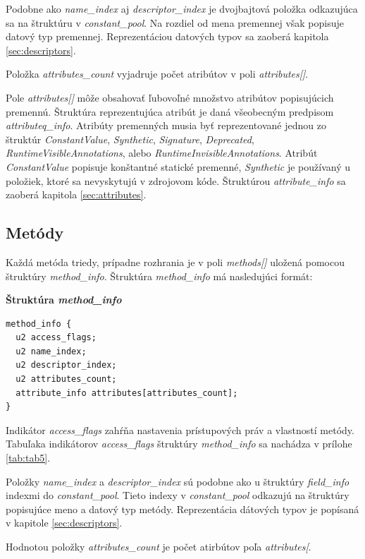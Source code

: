 \documentclass[11pt,final,oneside]{fithesis}
\newenvironment{example}[1]
{
\vspace{5mm}
\noindent\textbf{#1}
\vspace{1mm}
}
{
\vspace{5mm}
}
\begin{document}
Podobne ako \textit{name\_index} aj \textit{descriptor\_index} je dvojbajtová
položka odkazujúca sa na štruktúru v \textit{constant\_pool}. Na rozdiel od
mena premennej však popisuje datový typ premennej. Reprezentáciou datových
typov sa zaoberá kapitola \ref{sec:descriptors}.

Položka \textit{attributes\_count} vyjadruje počet atribútov v poli
\textit{attributes[]}.

Pole \textit{attributes[]} môže obsahovať ľubovoľné množstvo atribútov
popisujúcich premennú. Štruktúra reprezentujúca atribút je daná všeobecným
predpisom \textit{attributeq\_info}. Atribúty premenných musia byť
reprezentované jednou zo štruktúr \textit{ConstantValue}, \textit{Synthetic},
\textit{Signature}, \textit{Deprecated}, \textit{RuntimeVisibleAnnotations},
alebo \textit{RuntimeInvisibleAnnotations}. Atribút \textit{ConstantValue}
popisuje konštantné statické premenné, \textit{Synthetic} je používaný u
položiek, ktoré sa nevyskytujú v zdrojovom kóde. Štruktúrou
\textit{attribute\_info} sa zaoberá kapitola \ref{sec:attributes}.

\subsection{Metódy}
\label{sec:methods}
Každá metóda triedy, prípadne rozhrania je v poli \textit{methods[]} uložená
pomocou štruktúry \textit{method\_info}. Štruktúra \textit{method\_info} má
nasledujúci formát:

\begin{example}{Štruktúra \textit{method\_info}}
\begin{verbatim}
method_info {
  u2 access_flags;
  u2 name_index;
  u2 descriptor_index;
  u2 attributes_count;
  attribute_info attributes[attributes_count];
}
\end{verbatim}
\end{example}

Indikátor \textit{access\_flags} zahŕňa nastavenia prístupových práv a
vlastností metódy. Tabuľaka indikátorov \textit{access\_flags} štruktúry
\textit{method\_info} sa nachádza v prílohe \ref{tab:tab5}.

Položky \textit{name\_index} a \textit{descriptor\_index} sú podobne ako u
štruktúry \textit{field\_info} indexmi do \textit{constant\_pool}. Tieto indexy
v \textit{constant\_pool} odkazujú na štruktúry popisujúce meno a datový typ
metódy. Reprezentácia dátových typov je popísaná v kapitole
\ref{sec:descriptors}.

Hodnotou položky \textit{attributes\_count} je počet atirbútov
poľa \textit{attributes[}.
\end{document}
